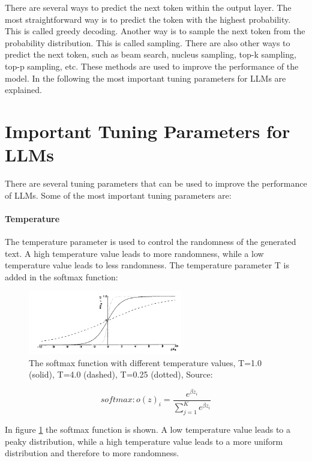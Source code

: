 There are several ways to predict the next token within the output layer. The most straightforward way is to predict the token with the highest probability. This is called greedy decoding. Another way is to sample the next token from the probability distribution. This is called sampling. There are also other ways to predict the next token, such as beam search, nucleus sampling, top-k sampling, top-p sampling, etc. These methods are used to improve the performance of the model. In the following the most important tuning parameters for LLMs are explained.

\section{Important Tuning Parameters for LLMs}

There are several tuning parameters that can be used to improve the performance of LLMs. Some of the most important tuning parameters are:

\paragraph{Temperature}
The temperature parameter is used to control the randomness of the generated text. A high temperature value leads to more randomness, while a low temperature value leads to less randomness. The temperature parameter T is added in the softmax function:

\begin{figure}[h!]
    \centering
    \includegraphics[width=0.6\textwidth]{images/temperature.png}
    \caption{The softmax function with different temperature values, T=1.0 (solid), T=4.0 (dashed), T=0.25 (dotted), Source: \cite{ACKLEY.1985}}
    \label{fig:temperature}
\end{figure}

$$softmax: o(z)_i = \frac{e^{\beta z_i}}{\sum_{j=1}^K e^{\beta z_i}}$$

In figure \ref{fig:temperature} the softmax function is shown. A low temperature value leads to a peaky distribution, while a high temperature value leads to a more uniform distribution and therefore to more randomness.


